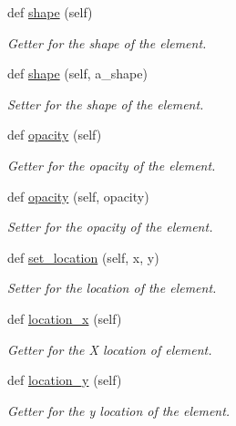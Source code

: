 \begin{DoxyCompactItemize}
def \hyperlink{classbridges_1_1element__visualizer_1_1_element_visualizer_a79ee08777449e532ff2131785647b515}{shape} (self)
\begin{DoxyCompactList}\small\item\em Getter for the shape of the element. \end{DoxyCompactList}\item 
def \hyperlink{classbridges_1_1element__visualizer_1_1_element_visualizer_af4bd377b8fb9a35c10740de7ea8c5eee}{shape} (self, a\+\_\+shape)
\begin{DoxyCompactList}\small\item\em Setter for the shape of the element. \end{DoxyCompactList}\item 
def \hyperlink{classbridges_1_1element__visualizer_1_1_element_visualizer_a64288f56aa9cb5f3ccf703d696df1c04}{opacity} (self)
\begin{DoxyCompactList}\small\item\em Getter for the opacity of the element. \end{DoxyCompactList}\item 
def \hyperlink{classbridges_1_1element__visualizer_1_1_element_visualizer_ab282e5e9b704c8ccf923cc117b541b3a}{opacity} (self, opacity)
\begin{DoxyCompactList}\small\item\em Setter for the opacity of the element. \end{DoxyCompactList}\item 
def \hyperlink{classbridges_1_1element__visualizer_1_1_element_visualizer_a7aef4402f2de7e88a3260bbec3a708a7}{set\+\_\+location} (self, x, y)
\begin{DoxyCompactList}\small\item\em Setter for the location of the element. \end{DoxyCompactList}\item 
def \hyperlink{classbridges_1_1element__visualizer_1_1_element_visualizer_a10fc24a04e43afcb393f3444bd93f5d9}{location\+\_\+x} (self)
\begin{DoxyCompactList}\small\item\em Getter for the X location of element. \end{DoxyCompactList}\item 
def \hyperlink{classbridges_1_1element__visualizer_1_1_element_visualizer_a687747f04ae17dea9d15706602688a32}{location\+\_\+y} (self)
\begin{DoxyCompactList}\small\item\em Getter for the y location of the element. \end{DoxyCompactList}\end{DoxyCompactItemize}
